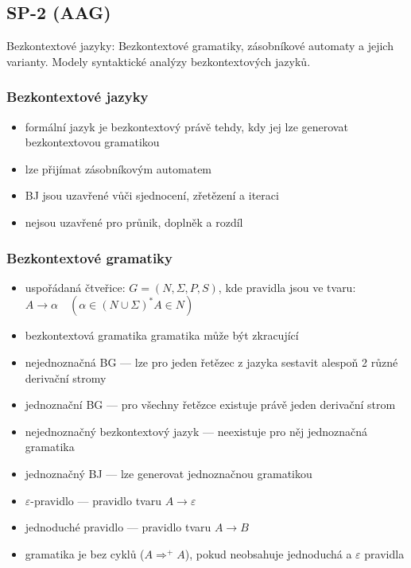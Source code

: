 \subsection{SP-2 (AAG)}
Bezkontextové jazyky: Bezkontextové gramatiky, zásobníkové automaty a jejich varianty. Modely syntaktické analýzy bezkontextových jazyků.

\subsubsection*{Bezkontextové jazyky}
\begin{itemize}
	\item formální jazyk je bezkontextový právě tehdy, kdy jej lze generovat bezkontextovou gramatikou
	\item lze přijímat zásobníkovým automatem
	\item BJ jsou uzavřené vůči sjednocení, zřetězení a iteraci
	\item nejsou uzavřené pro průnik, doplněk a rozdíl
\end{itemize}

\subsubsection*{Bezkontextové gramatiky}
\begin{itemize}
	\item uspořádaná čtveřice: $G = (N, \Sigma, P, S)$, kde pravidla jsou ve tvaru: $A \rightarrow \alpha \quad (\alpha \in (N \cup \Sigma)^* A \in N)$
	\item bezkontextová gramatika gramatika může být zkracující
	\item nejednoznačná BG --- lze pro jeden řetězec z jazyka sestavit alespoň 2 různé derivační stromy
	\item jednoznační BG --- pro všechny řetězce existuje právě jeden derivační strom
	\item nejednoznačný bezkontextový jazyk --- neexistuje pro něj jednoznačná gramatika
	\item jednoznačný BJ --- lze generovat jednoznačnou gramatikou
	\item $\varepsilon$-pravidlo --- pravidlo tvaru $A \rightarrow \varepsilon$
	\item jednoduché pravidlo --- pravidlo tvaru $A \rightarrow B$
	\item gramatika je bez cyklů ($A \Rightarrow^+ A$), pokud neobsahuje jednoduchá a $\varepsilon$ pravidla
\end{itemize}

